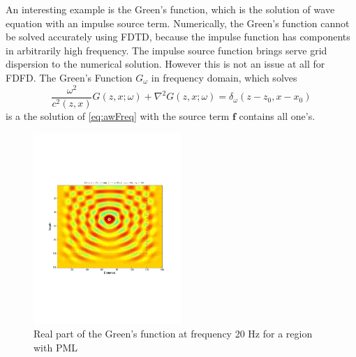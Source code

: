 \documentclass[11pt,titlepage]{article}
\newcommand{\bff}{\boldsymbol{f}}
\theoremstyle{plain}
\theoremstyle{definition}
\theoremstyle{remark}
\numberwithin{equation}{section}
\begin{document}
An interesting example is the Green's function, which is the solution of wave equation with an impulse source term. Numerically, the Green's function cannot be solved accurately using FDTD, because the impulse function has components in arbitrarily high
frequency. The impulse source function brings serve grid dispersion to the numerical solution. However this is not an issue at all for FDFD. The Green's Function 
$G_{\omega}$ in frequency domain, which solves  
  \begin{equation}
  \frac{\omega^2}{c^2(z, x)}G(z, x;\omega) + \nabla^2 G(z, x;\omega) = \delta_{\omega}(z-z_0, x-x_0)
  \end{equation}
  is a the solution of \eqref{eq:awFreq} with the source term $\bff$ contains all one's.
  
\begin{figure}[htbp]
\centering
\includegraphics[width=0.5\textwidth]{Fig/GreensFunction.pdf}
\caption{Real part of the Green's function at frequency 20 Hz for a region with PML} 
\end{figure}
\end{document}
